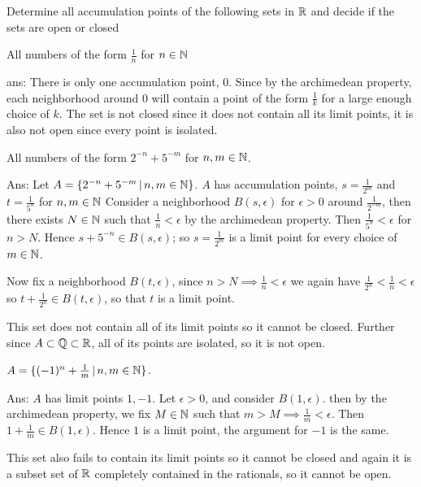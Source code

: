 


    \maketitle 

    \question
    Determine all accumulation points of the following sets in $\mathbb{R}$ and decide if 
    the sets are open or closed
    \begin{alphaparts}
        \questionpart 
        All numbers of the form $\frac{1}{n}$ for $n \in \mathbb{N}$ 

        ans: There is only one accumulation point, $0$. Since 
        by the archimedean property, each neighborhood around $0$ will contain 
        a point of the form $\frac{1}{k}$ for a large enough choice of $k$. 
        The set is not closed since it does not contain all its limit points, 
        it is also not open since every point is isolated. 

        \questionpart 
        All numbers of the form $2^{-n} + 5^{-m}$ for $n,m \in \mathbb{N}$. 

        Ans: Let $A = \{2^{-n} + 5^{-m} \, | \, n, m \in \mathbb{N} \}$. 
       $A$ has accumulation points, $s = \frac{1}{2^{m}}$ and $t = \frac{1}{5^{n}}$ for $n,m \in \mathbb{N}$
       Consider a neighborhood $B(s, \epsilon)$ for  $\epsilon > 0$ around $\frac{1}{2^{-m}}$, then there exists $N \in \mathbb{N}$ such that $\frac{1}{n} < \epsilon$ 
       by the archimedean property. Then $\frac{1}{5^n} < \epsilon$ for $n > N$. Hence $s + 5^{-n} \in B(s, \epsilon)$; 
       so $s = \frac{1}{2^m}$ is a limit point for every choice of $m \in \mathbb{N}$. 

       Now fix a neighborhood $B(t, \epsilon)$, since $n > N \implies \frac{1}{n} < \epsilon$ we again 
       have $\frac{1}{2^n} < \frac{1}{n} < \epsilon$ so $t + \frac{1}{2^n} \in B(t, \epsilon)$, 
       so that $t$ is a limit point. 

       This set does not contain all of its limit points so it cannot be closed. Further since $A \subset \mathbb{Q} \subset \mathbb{R}$, 
       all of its points are isolated, so it is not open. 

       \questionpart 
       $A = \{(-1)^n + \frac{1}{m} \, | \, n, m \in \mathbb{N}\}$.
       
       Ans: $A$ has limit points $1, -1$. Let $\epsilon > 0$, and consider $B(1,\epsilon)$. 
       then by the archimedean property, we fix $M \in \mathbb{N}$ such that $m > M \implies \frac{1}{m} < \epsilon$. 
       Then $1 + \frac{1}{m} \in B(1, \epsilon)$. Hence $1$ is a limit point, the argument for $-1$ is the same. 


       This set also fails to contain its limit points so it cannot be closed and again it is a subset set of $\mathbb{R}$ completely contained 
       in the rationals, so it cannot be open. 

    \end{alphaparts}

